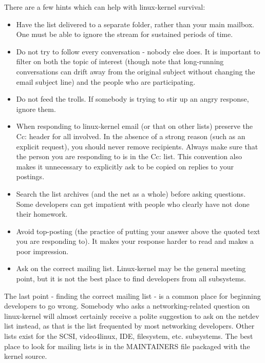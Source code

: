 \documentclass[a4paper,8pt,english]{sphinxmanual}
\begin{document}
There are a few hints which can help with linux-kernel survival:
\begin{itemize}
\item {} 
Have the list delivered to a separate folder, rather than your main
mailbox.  One must be able to ignore the stream for sustained periods of
time.

\item {} 
Do not try to follow every conversation - nobody else does.  It is
important to filter on both the topic of interest (though note that
long-running conversations can drift away from the original subject
without changing the email subject line) and the people who are
participating.

\item {} 
Do not feed the trolls.  If somebody is trying to stir up an angry
response, ignore them.

\item {} 
When responding to linux-kernel email (or that on other lists) preserve
the Cc: header for all involved.  In the absence of a strong reason (such
as an explicit request), you should never remove recipients.  Always make
sure that the person you are responding to is in the Cc: list.  This
convention also makes it unnecessary to explicitly ask to be copied on
replies to your postings.

\item {} 
Search the list archives (and the net as a whole) before asking
questions.  Some developers can get impatient with people who clearly
have not done their homework.

\item {} 
Avoid top-posting (the practice of putting your answer above the quoted
text you are responding to).  It makes your response harder to read and
makes a poor impression.

\item {} 
Ask on the correct mailing list.  Linux-kernel may be the general meeting
point, but it is not the best place to find developers from all
subsystems.

\end{itemize}

The last point - finding the correct mailing list - is a common place for
beginning developers to go wrong.  Somebody who asks a networking-related
question on linux-kernel will almost certainly receive a polite suggestion
to ask on the netdev list instead, as that is the list frequented by most
networking developers.  Other lists exist for the SCSI, video4linux, IDE,
filesystem, etc. subsystems.  The best place to look for mailing lists is
in the MAINTAINERS file packaged with the kernel source.
\end{document}
